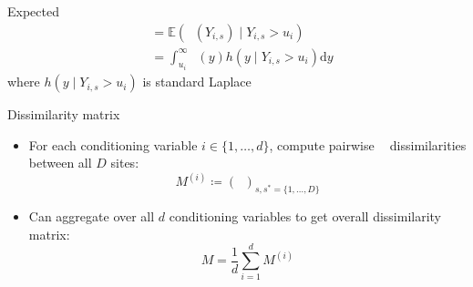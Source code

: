 \documentclass[14pt,aspectratio=169]{beamer}
\newcommand{\cJSGa}[1]{\mathop{\mathrm{cJS}_{i, #1}^{\mathrm{G}_{\lambda}}}\nolimits}
\newcommand{\eJSGa}[1]{\mathop{\mathrm{eJS}_{i, #1}^{\mathrm{G}_{\lambda}}}\nolimits}
\DeclareRobustCommand{\eJSGai}{\mathop{\mathrm{eJS}^{\mathrm{G}_{\lambda}}}\nolimits}
\begin{document}
\begin{frame}{Expected $\cJSGa{s, s^*}$}
  \vspace{-1cm}
  \begin{align*}
    \eJSGa{s, s^*} &= \mathbb{E}\left(\cJSGa{s, s^*}(Y_{i,s}) \mid Y_{i,s} > u_i\right) \\
                   &= \int_{u_i}^{\infty} \cJSGa{s, s^*}(y) h(y \mid Y_{i,s} > u_i) \mathrm{d}y
  \end{align*}
  where $h(y \mid Y_{i,s} > u_i)$ is standard Laplace 
\end{frame}

\begin{frame}{Dissimilarity matrix}
  \begin{itemize}
    \item <1-> For each conditioning variable $i \in \{1, \ldots, d\}$, compute pairwise $\eJSGai{}$ dissimilarities between all $D$ sites:
    \begin{equation*} 
      M^{(i)} \coloneq \left(\eJSGa{s, s^*} \right)_{s, s^* = \{1, \ldots, D\}}
    \end{equation*}
  \item <2-> Can aggregate over all $d$ conditioning variables to get overall dissimilarity matrix:
    \begin{equation*}
      M = \frac{1}{d} \sum_{i=1}^{d} M^{(i)}
    \end{equation*}
  \end{itemize}
\end{frame}
\end{document}
